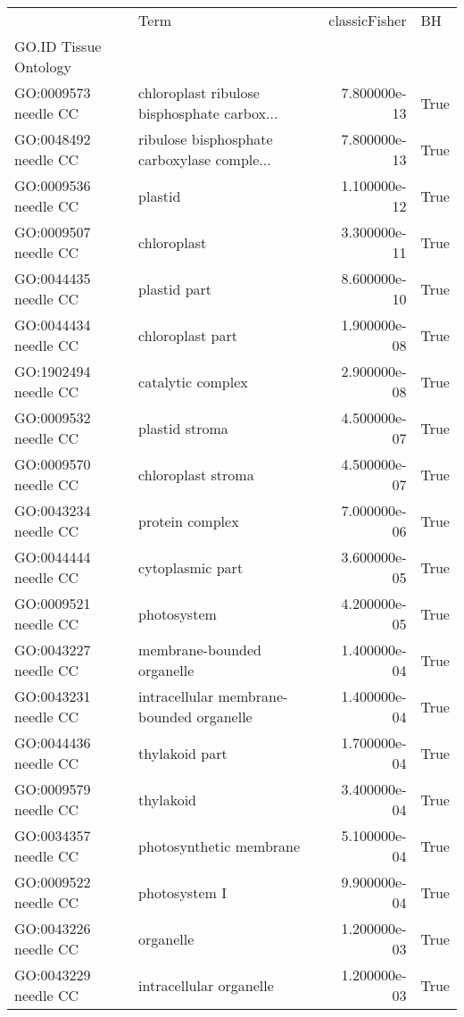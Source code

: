 \begin{tabular}{llrl}
\toprule
{} &                                         Term &  classicFisher &     BH \\
GO.ID      Tissue Ontology &                                              &                &        \\
GO:0009573 needle CC       &  chloroplast ribulose bisphosphate carbox... &  7.800000e-13 &  True \\
\midrule
GO:0048492 needle CC       &  ribulose bisphosphate carboxylase comple... &  7.800000e-13 &  True \\
GO:0009536 needle CC       &  plastid &  1.100000e-12 &  True \\
GO:0009507 needle CC       &  chloroplast &  3.300000e-11 &  True \\
GO:0044435 needle CC       &  plastid part &  8.600000e-10 &  True \\
GO:0044434 needle CC       &  chloroplast part &  1.900000e-08 &  True \\
GO:1902494 needle CC       &  catalytic complex &  2.900000e-08 &  True \\
GO:0009532 needle CC       &  plastid stroma &  4.500000e-07 &  True \\
GO:0009570 needle CC       &  chloroplast stroma &  4.500000e-07 &  True \\
GO:0043234 needle CC       &  protein complex &  7.000000e-06 &  True \\
GO:0044444 needle CC       &  cytoplasmic part &  3.600000e-05 &  True \\
GO:0009521 needle CC       &  photosystem &  4.200000e-05 &  True \\
GO:0043227 needle CC       &  membrane-bounded organelle &  1.400000e-04 &  True \\
GO:0043231 needle CC       &  intracellular membrane-bounded organelle &  1.400000e-04 &  True \\
GO:0044436 needle CC       &  thylakoid part &  1.700000e-04 &  True \\
GO:0009579 needle CC       &  thylakoid &  3.400000e-04 &  True \\
GO:0034357 needle CC       &  photosynthetic membrane &  5.100000e-04 &  True \\
GO:0009522 needle CC       &  photosystem I &  9.900000e-04 &  True \\
GO:0043226 needle CC       &  organelle &  1.200000e-03 &  True \\
GO:0043229 needle CC       &  intracellular organelle &  1.200000e-03 &  True \\

\end{tabular}
